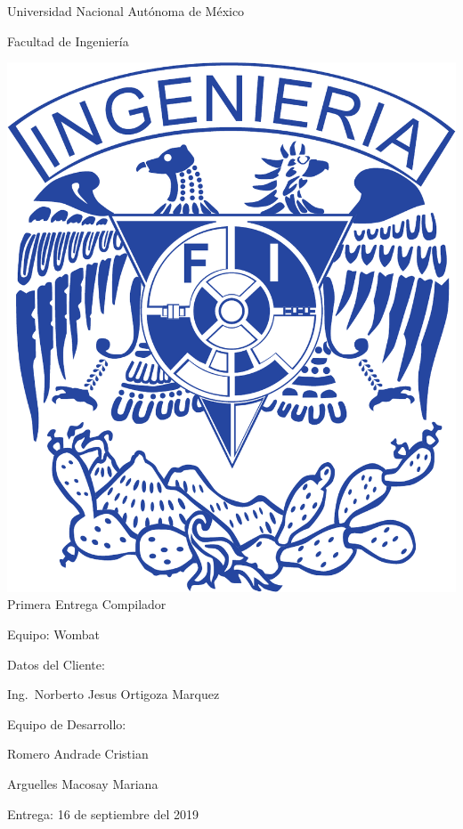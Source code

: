 \documentclass{article}
\begin{document}
\begin{titlepage}
  \begin{center}
    \Huge{Universidad Nacional Autónoma de México}

    \Huge{Facultad de Ingeniería}
    \vfill

    \includegraphics[scale=.3]{../img/UNAM_INGENIERIA}
    \vfill
    \Large{Primera Entrega Compilador}

    
    \vfill
    \LARGE{Equipo: Wombat}
    \vfill
  \end{center}  

  \Large{Datos del Cliente:
    
    \hspace{2cm}} Ing.\ Norberto Jesus Ortigoza Marquez
  \vfill
  
  \Large{Equipo de Desarrollo:
    
    \hspace{2cm}Romero Andrade Cristian
    
    \hspace{2cm}Arguelles Macosay Mariana}
  \vfill
  \Large{Entrega: 16 de septiembre del 2019}
  

  
  
\end{titlepage}
\end{document}
